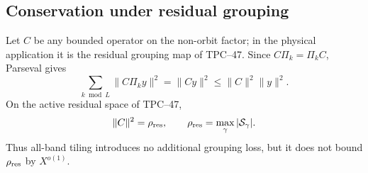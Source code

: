 \subsection{Conservation under residual grouping}

Let \(C\) be any bounded operator on the non-orbit factor; in the
physical application it is the residual grouping map of TPC--47.  Since
\(C\Pi_k=\Pi_kC\), Parseval gives
\begin{equation}
 \sum_{k\bmod L}\|C\Pi_ky\|^2=\|Cy\|^2
 \le\|C\|^2\|y\|^2.
 \label{eq:tpc48-grouped-band-conservation}
\end{equation}
On the active residual space of TPC--47,
\begin{equation}
 \|C\|^2=\rho_{\rm res},
 \qquad
 \rho_{\rm res}=\max_\gamma|\mathcal S_\gamma|.
 \label{eq:tpc48-grouping-norm}
\end{equation}
Thus all-band tiling introduces no additional grouping loss, but it
does not bound \(\rho_{\rm res}\) by \(X^{o(1)}\).
